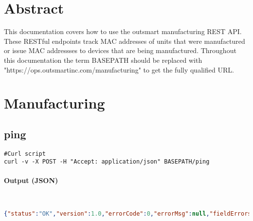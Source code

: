 \documentclass[
10pt, %
letterpaper, %
oneside, %
headinclude,footinclude, %
BCOR5mm, %
]{scrartcl}
\title{\normalfont\spacedallcaps{Manufacturing REST Documentation}} %
\author{\spacedlowsmallcaps{Michael Meding* , mmeding@outsmartinc.com}} %
\date{} %
\begin{document}
\maketitle %

\setcounter{tocdepth}{2} %

\tableofcontents %

\thispagestyle{empty} %

 
\section*{Abstract}
This documentation covers how to use the outsmart manufacturing REST API. These RESTful endpoints track MAC addresses of units that were manufactured or issue MAC addressses to devices that are being manufactured. Throughout this documentation the term BASEPATH should be replaced with "https://ops.outsmartinc.com/manufacturing" to get the fully qualified URL.

 


\section{Manufacturing}


\subsection{ping}
\begin{lstlisting}
#Curl script
curl -v -X POST -H "Accept: application/json" BASEPATH/ping
\end{lstlisting}

\paragraph{Output (JSON)}~
\begin{lstlisting}[language=json]
{"status":"OK","version":1.0,"errorCode":0,"errorMsg":null,"fieldErrors":null,"data":null}
\end{lstlisting}
\end{document}
